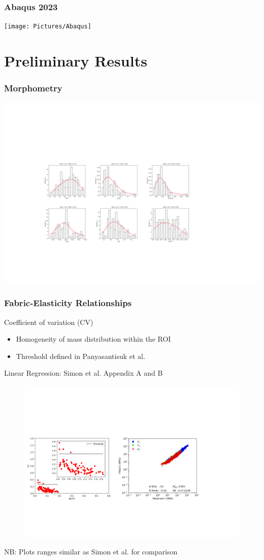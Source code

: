 \documentclass[xcolor=table,11pt]{beamer}
\begin{document}
	\begin{frame}
		\frametitle{Abaqus 2023}
		\texttt{[image: Pictures/Abaqus]}\\
	\end{frame}

	\section{Preliminary Results}

	\begin{frame}
		\frametitle{Morphometry}
		\centering
		\includegraphics[width=\linewidth]{Pictures/Morphometry}
	\end{frame}

	\begin{frame}
		\frametitle{Fabric-Elasticity Relationships}
		Coefficient of variation (CV)
		\begin{itemize}
			\item Homogeneity of mass distribution within the ROI
			\item Threshold defined in Panyasantisuk et al. \cite{p1}
		\end{itemize}
		Linear Regression: Simon et al. \cite{p2} Appendix A and B
		\begin{figure}
			\centering
			\includegraphics[width=\linewidth]{Pictures/FabricElasticity}
		\end{figure}
		\tiny{NB: Plots ranges similar as Simon et al. \cite{p2} for comparison}
	\end{frame}
		
\end{document}
